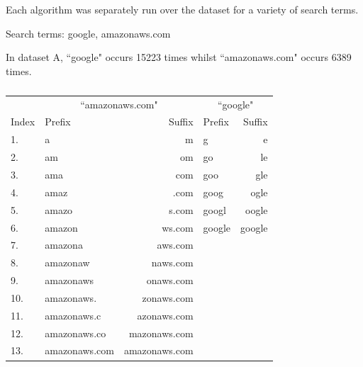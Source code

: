 \documentclass{article}
\begin{document}
Each algorithm was separately run over the dataset for a variety of search terms.

Search terms: google, amazonaws.com

In dataset A, ``google" occurs 15223 times whilst ``amazonaws.com" occurs 6389 times.

\begin{table}[h!bt]
  \centering
  \begin{tabular}{l|l|r||l|r}
    & \multicolumn{2}{c}{``amazonaws.com"} & \multicolumn{2}{c}{``google"} \\
    Index & Prefix & Suffix & Prefix & Suffix \\
    \hline
    1. & a  & m  & g  & e \\
    2. & am  & om  & go  & le \\
    3. & ama  & com  & goo  & gle \\
    4. & amaz  & .com  & goog  & ogle \\
    5. & amazo  & s.com  & googl  & oogle \\
    6. & amazon  & ws.com  & google  & google \\
    7. & amazona  & aws.com  &  & \\
    8. & amazonaw  & naws.com  &  & \\
    9. & amazonaws  & onaws.com  &  & \\
    10. & amazonaws.  & zonaws.com  &  & \\
    11. & amazonaws.c  & azonaws.com  &  & \\
    12. & amazonaws.co  & mazonaws.com  &  & \\
    13. & amazonaws.com  & amazonaws.com  &  & 
  \end{tabular}
  \caption{}
\end{table}
\end{document}
